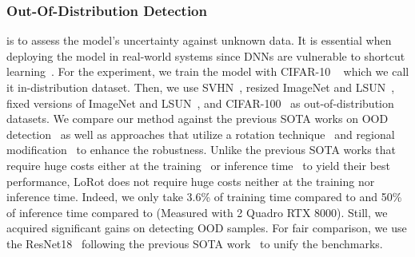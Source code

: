 \subsubsection{Out-Of-Distribution Detection}
\label{subsection:OODExperiments}
 is to assess the model's uncertainty against unknown data. 
It is essential when deploying the model in real-world systems since DNNs are vulnerable to shortcut learning~\cite{geirhos2020shortcut, nguyen2015deep, hendrycks2016baseline}.
For the experiment, we train the model with CIFAR-10 ~\cite{krizhevsky2009learning} which we call it in-distribution dataset. 
Then, we use SVHN~\cite{netzer2011reading}, resized ImageNet and LSUN~\cite{liang2017enhancing}, fixed versions of ImageNet and LSUN~\cite{tack2020csi}, and CIFAR-100~\cite{krizhevsky2009learning} as out-of-distribution datasets.
We compare our method against the previous SOTA works on OOD detection~\cite{hendrycks2019using, tack2020csi} as well as approaches that utilize a rotation technique~\cite{lee2020self} and regional modification~\cite{yun2019cutmix} to enhance the robustness.
Unlike the previous SOTA works that require huge costs either at the training~\cite{tack2020csi} or inference time~\cite{hendrycks2019using} to yield their best performance, LoRot does not require huge costs neither at the training nor inference time.
Indeed, we only take 3.6\% of training time compared to \cite{tack2020csi} and 50\% of inference time compared to \cite{hendrycks2019using} (Measured with 2 Quadro RTX 8000).
Still, we acquired significant gains on detecting OOD samples. For fair comparison, we use the ResNet18~\cite{he2016deep} following the previous SOTA work~\cite{tack2020csi} to unify the benchmarks. 


